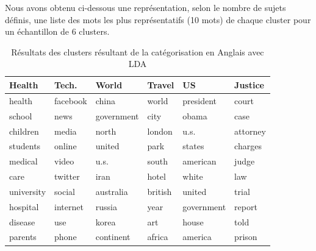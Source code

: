     Nous avons obtenu ci-dessous une représentation, selon le nombre de sujets définis, une liste des mots les plus représentatifs (10 mots) de chaque cluster pour un échantillon de 6 clusters.
    \begin{table}[H]
        \begin{center}
            \begin{tabular}{|C{2.1cm}|C{2.1cm}|C{2.1cm}|C{2.1cm}|C{2.1cm}|C{2.1cm}|}
                \hline                      
                \textbf{Health} & \textbf{Tech.} & \textbf{World} & \textbf{Travel} & \textbf{US} & \textbf{Justice}\\ 
                \hline     
                health &  facebook &         china  &    world  &     president   &   court \\
                school  &     news  &   government  &     city     &      obama  &     case \\
                children  &    media   &       north  &   london     &       u.s.  & attorney \\  
                students  &   online   &      united  &     park     &     states  &  charges \\  
                medical  &    video   &        u.s.  &    south     &   american  &    judge \\  
                care  &  twitter   &        iran  &    hotel     &      white  &      law \\  
                university  &   social   &      australia  &  british     &     united  & trial \\ 
                hospital &  internet   &      russia   &    year   &   government  &   report \\  
                disease   &     use   &       korea   &     art & house  &    told  \\  
                parents   &   phone & continent &   africa    &     america  &   prison \\  
                \hline
                
            \end{tabular}
        \end{center}
        \caption{Résultats des clusters résultant de la catégorisation en Anglais avec LDA}
        \label{Lda-categ}
    \end{table}                           

